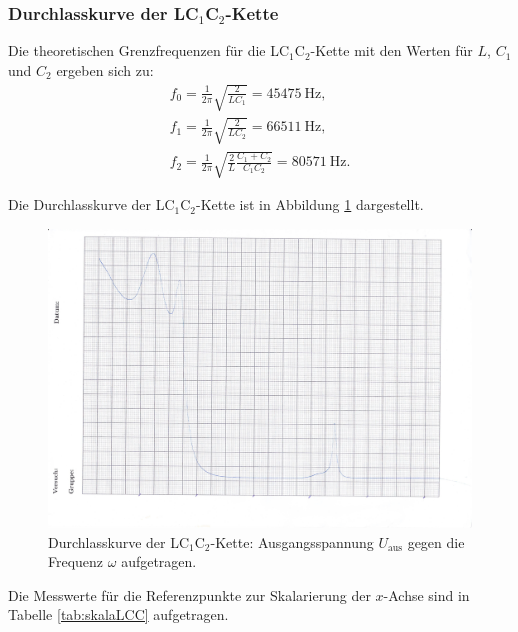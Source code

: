 \FloatBarrier
\subsubsection{Durchlasskurve der LC$_1$C$_2$-Kette}

Die theoretischen Grenzfrequenzen für die LC$_1$C$_2$-Kette mit den Werten für
$L$, $C_1$ und $C_2$ ergeben sich zu:
\begin{gather*}
	f_0 = \frac{1}{2\pi} \sqrt{\frac{2}{LC_1}} = \SI{45475}{\hertz} \text{,} \\
	f_1 = \frac{1}{2\pi} \sqrt{\frac{2}{LC_2}} = \SI{66511}{\hertz} \text{,} \\
	f_2 = \frac{1}{2\pi} \sqrt{\frac{2}{L} \frac{C_1+C_2}{C_1C_2}} = \SI{80571}{\hertz} \text{.}
\end{gather*}

Die Durchlasskurve der LC$_1$C$_2$-Kette ist in Abbildung \ref{fig:durchiLCC} dargestellt.

\begin{figure}
	\centering
	\includegraphics[width=1.02\textwidth]{Bilder/durchlasskurve_lc1c2.jpg}
	\caption{Durchlasskurve der LC$_1$C$_2$-Kette: Ausgangsspannung $U_{\text{aus}}$ gegen
		die Frequenz $\omega$ aufgetragen.}
	\label{fig:durchiLCC}
\end{figure}

Die Messwerte für die Referenzpunkte zur Skalarierung der $x$-Achse sind in Tabelle
\ref{tab:skalaLCC} aufgetragen.

